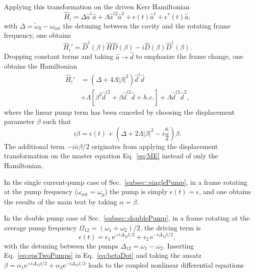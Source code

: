 \documentclass[pra,twocolumn,superscriptaddress]{revtex4-1}
\newcommand{\ah}[0]{\hat{a}}
\newcommand{\dhat}[0]{\hat{d}}
\newcommand{\wpump}[0]{\omega_{\mathrm{p}}}
\newcommand{\kappaTot}[0]{\overline{\kappa}}
\newcommand{\parS}[1]{\left[#1\right]}
\newcommand{\parO}[1]{\left(#1\right)}
\newcommand{\abs}[1]{\left|#1\right|}
\newcommand{\erm}[0]{\mathrm{e}}
\begin{document}
Applying this transformation on the driven Kerr Hamiltonian
\begin{equation}
	\hat H_i = \Delta \ah^\dag \ah + \Lambda \ah^{\dag 2} \ah ^2 + \epsilon(t) \ah ^\dag  + \epsilon^*(t) \ah,
\end{equation} 
with $\Delta= \tilde{\omega}_0 - \omega_{\mathrm{rot}}$ the detuning between the cavity and the rotating frame frequency,
one obtains
\begin{equation}
	\hat H_i' = \hat D^\dag (\beta) \hat H \hat D(\beta) - i \dot{\hat D}(\beta) \hat D^\dag (\beta).
\end{equation}
Dropping constant terms and taking $\ah \to \dhat$ to emphasize the frame change, one obtains the Hamiltonian
\begin{equation}
	\begin{split}
	\hat H_i' &= \parO{ \Delta+ 4 \Lambda \abs{\beta}^2  } \dhat^\dag \dhat
	\\ &
		+ \Lambda \parS{ \beta^2 \dhat^{\dag 2} + \beta \dhat^{\dag 2} \dhat   + h.c.} + \Lambda \dhat^{\dag 2} \dhat^2,
	\end{split}
\end{equation}
where the linear pump term has been canceled by choosing the displacement parameter $\beta$ such that
\begin{equation}
	i \dot \beta = \epsilon(t) + \parO{ \Delta + 2 \Lambda \abs{\beta}^2
	 - i \frac{ \kappaTot }{2}  } \beta.
	 \label{eq:betaDot}
\end{equation}
The additional term $-i \kappaTot \beta /2$ originates from applying the displacement transformation on the master equation Eq.~\eqref{eq:ME} instead of only the Hamiltonian.

In the single current-pump case of Sec.~\ref{subsec::singlePump}, in a frame rotating at the pump frequency ($\omega_{\mathrm{rot}} = \wpump$) the pump is simply $\epsilon(t) = \epsilon$, and one obtains the results of the main text by taking $\alpha = \beta$.

In the double pump case of Sec.~\ref{subsec::doublePump}, in a frame rotating at the average pump frequency $\Omega_{12} = (\omega_1 + \omega_2)/2 $,
the driving term is 
\begin{equation}
\epsilon(t) = \epsilon_1\, \erm^{+i \Delta_{12} t/2}
		 	+
		 	\epsilon_2\, \erm^{-i \Delta_{12} t/2},
		 	\label{eq:epsTwoPumps}
\end{equation}
with the detuning between the pumps $\Delta_{12} = \omega_1 - \omega_2$.
Inserting Eq.~\eqref{eq:epsTwoPumps} in Eq.~\eqref{eq:betaDot} and taking the ansatz $\beta = \alpha_1 \erm^{+i \Delta_{12}t /2} + \alpha_2 \erm^{-i \Delta_{12}t /2} $ leads to the coupled nonlinear differential equations
\end{document}
